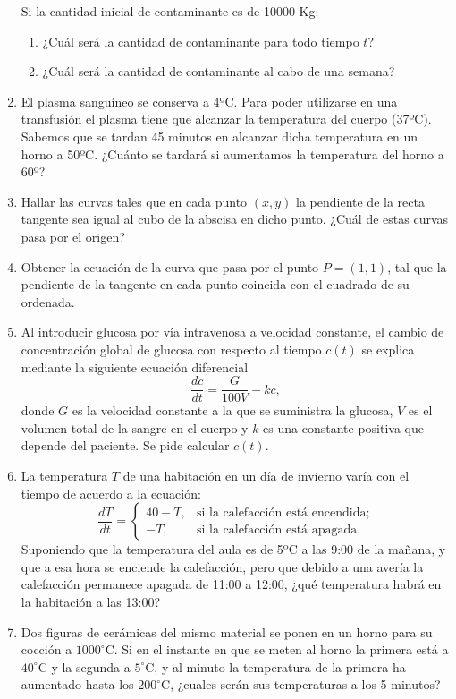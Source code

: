 \documentclass[a4paper,titlepage]{article}
\theoremstyle{solution}
\begin{document}
\begin{enumerate}[resume, leftmargin=*]
Si la cantidad inicial de contaminante es de 10000 Kg:
\begin{enumerate}
\item ¿Cuál será la cantidad de contaminante para todo tiempo $t$?
\item ¿Cuál será la cantidad de contaminante al cabo de una semana?
\end{enumerate}

\item El plasma sanguíneo se conserva a 4ºC. Para poder utilizarse en una transfusión el plasma tiene que alcanzar la temperatura del cuerpo (37ºC). Sabemos que se tardan 45 minutos en alcanzar dicha temperatura en un horno a 50ºC.
¿Cuánto se tardará si aumentamos la temperatura del horno a 60º?

\item Hallar las curvas tales que en cada punto $(x,y)$ la pendiente de la recta tangente sea igual al cubo de la abscisa en
dicho punto.
¿Cuál de estas curvas pasa por el origen?

\item Obtener la ecuación de la curva que pasa por el punto $P=(1,1)$, tal que la pendiente de la tangente en cada punto coincida con el cuadrado de su ordenada.

\item Al introducir glucosa por vía intravenosa a velocidad constante, el cambio de concentración global de glucosa con respecto al tiempo $c(t)$ se explica mediante la siguiente ecuación diferencial 
\[
\frac{dc}{dt}=\frac{G}{100V}-kc,
\]
donde $G$ es la velocidad constante a la que se suministra la glucosa, $V$ es el volumen total de la sangre en el cuerpo y $k$ es una constante positiva que depende del paciente.
Se pide calcular $c(t)$.

\item La temperatura $T$ de una habitación en un día de invierno varía con el tiempo de acuerdo a la ecuación:
\[
\frac{dT}{dt}=
\begin{cases}
40-T, & \mbox{si la calefacción está encendida;} \\
-T, & \mbox{si la calefacción está apagada.}
\end{cases}
\]
Suponiendo que la temperatura del aula es de 5ºC  a las 9:00 de la mañana, y que a esa hora se enciende la calefacción, pero que debido a una avería la calefacción permanece apagada de 11:00 a 12:00, ¿qué temperatura habrá en la habitación a las 13:00?

\item Dos figuras de cerámicas del mismo material se ponen en un horno para su cocción a $1000^\circ$C. 
Si en el instante en que se meten al horno la primera está a $40^\circ$C y la segunda a $5^\circ$C, y al minuto la temperatura de la primera ha aumentado hasta los $200^\circ$C, ¿cuales serán sus temperaturas a los 5 minutos?


\end{enumerate}
\end{document}
